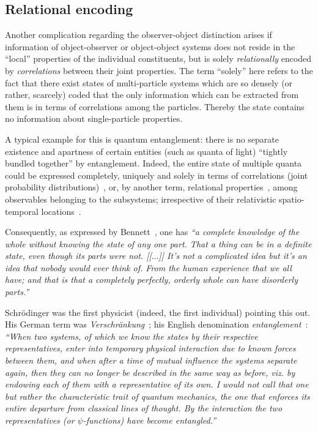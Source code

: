 \subsection{Relational encoding}

Another complication regarding the observer-object distinction
arises if information of object-observer or object-object systems
does not reside in the ``local'' properties of the individual constituents, but
is solely
{\em relationally} encoded by {\em correlations} between their joint properties.
The term ``solely'' here refers to the fact that there exist  states
of multi-particle systems
which are so densely (or rather, scarcely) coded that the only information which can be extracted from them
is in terms of correlations among the particles.
Thereby the state contains no information about single-particle properties.

A typical example for this is quantum entanglement:  there is no
separate existence and apartness of certain entities (such as quanta of light)
``tightly bundled together'' by entanglement.
Indeed, the entire state of multiple quanta
could be expressed completely, uniquely and solely in terms
of correlations (joint probability distributions)~\cite{Bergia1980,mermin:753},
or, by another term, relational properties~\cite{zeil-99},
among observables belonging to the subsystems;
irrespective of their relativistic spatio-temporal locations~\cite{Seevinck:2010eb}.

Consequently, as expressed by Bennett~\cite{Bennett-IBM-03.05.2016},
one has {\em ``a complete knowledge
of the whole without knowing the state of any one part. That a thing can be in a definite
state, even though its parts were not.
[[$\ldots$]]
It's not a complicated idea but
it's an idea that nobody would ever think of. From the human experience that we all
have; and that is that a completely perfectly, orderly whole can have disorderly parts.''}

Schr\"odinger was the first physicist (indeed, the first individual) pointing this out. His German term was {\it Verschr\"ankung}~\cite[p.~827,844]{schrodinger};
his English denomination {\em entanglement}~\cite{CambridgeJournals:1737068}:
{\em ``When two systems, of which we know the states by their respective representatives,
enter into temporary physical interaction due to known forces between
them, and when after a time of mutual influence the systems separate again, then
they can no longer be described in the same way as before, viz. by endowing each
of them with a representative of its own. I would not call that one but rather the
characteristic trait of quantum mechanics, the one that enforces its entire
departure from classical lines of thought. By the interaction the two representatives
(or $\psi$-functions) have become entangled.''}


